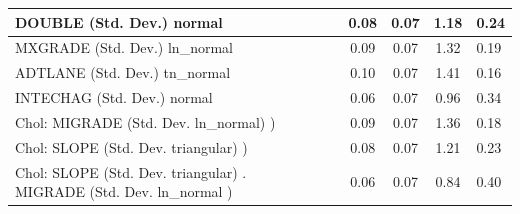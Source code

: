\begin{table}
\begin{center}
\begin{tabular}{|l|l|c|c|c|l|}
			\hline
			DOUBLE (Std. Dev.) normal &  & 0.08 & 0.07 & 1.18 & 0.24 \\
			\hline
			MXGRADE (Std. Dev.) ln_normal &  & 0.09 & 0.07 & 1.32 & 0.19 \\
			\hline
			ADTLANE (Std. Dev.) tn_normal &  & 0.10 & 0.07 & 1.41 & 0.16 \\
			\hline
			INTECHAG (Std. Dev.) normal &  & 0.06 & 0.07 & 0.96 & 0.34 \\
			\hline
			 Chol: MIGRADE (Std. Dev. ln_normal) ) &  & 0.09 & 0.07 & 1.36 & 0.18 \\
			\hline
			 Chol: SLOPE (Std. Dev. triangular) ) &  & 0.08 & 0.07 & 1.21 & 0.23 \\
			\hline
			 Chol: SLOPE (Std. Dev. triangular) . MIGRADE (Std. Dev.   ln_normal ) &  & 0.06 & 0.07 & 0.84 & 0.40 \\
			\hline
		\end{tabular}
	\end{center}
\end{table}